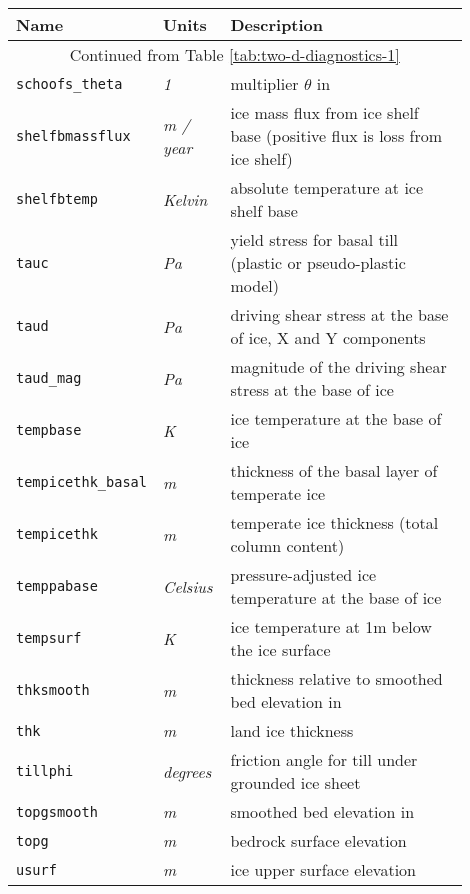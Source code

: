 \begin{table}[ht]
  \centering
  \begin{tabular}{p{0.15\linewidth}p{0.15\linewidth}p{0.6\linewidth}}
    \toprule
    \textbf{Name} & \textbf{Units} & \textbf{Description} \\
    \midrule
    \multicolumn{3}{c}{Continued from Table \ref{tab:two-d-diagnostics-1}}\\
    \texttt{schoofs_theta} & \textsl{1} &  multiplier $\theta$ in \cite{Schoofbasaltopg2003} \\
    \texttt{shelfbmassflux} & \textsl{m / year} & ice mass flux from ice shelf base (positive flux is loss from ice shelf) \\
    \texttt{shelfbtemp} & \textsl{Kelvin} & absolute temperature at ice shelf base \\
    \texttt{tauc} & \textsl{Pa} & yield stress for basal till (plastic or pseudo-plastic model) \\
    \texttt{taud} & \textsl{Pa} & driving shear stress at the base of ice, X and Y components \\
    \texttt{taud_mag} & \textsl{Pa} &  magnitude of the driving shear stress at the base of ice \\
    \texttt{tempbase} & \textsl{K} &  ice temperature at the base of ice \\
    \texttt{tempicethk_basal} & \textsl{m} &  thickness of the basal layer of temperate ice \\
    \texttt{tempicethk} & \textsl{m} &  temperate ice thickness (total column content) \\
    \texttt{temppabase} & \textsl{Celsius} &  pressure-adjusted ice temperature at the base of ice \\
    \texttt{tempsurf} & \textsl{K} &  ice temperature at 1m below the ice surface \\
    \texttt{thksmooth} & \textsl{m} &  thickness relative to smoothed bed elevation in \cite{Schoofbasaltopg2003} \\
    \texttt{thk} & \textsl{m} & land ice thickness \\
    \texttt{tillphi} & \textsl{degrees} & friction angle for till under grounded ice sheet \\
    \texttt{topgsmooth} & \textsl{m} &  smoothed bed elevation in \cite{Schoofbasaltopg2003}\\
    \texttt{topg} & \textsl{m} & bedrock surface elevation \\
    \texttt{usurf} & \textsl{m} & ice upper surface elevation \\

\end{tabular}
\end{table}
